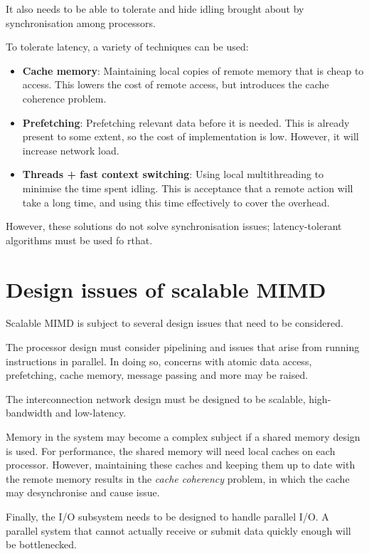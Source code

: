 It also needs to be able to tolerate and hide idling brought about by synchronisation among processors.

To tolerate latency, a variety of techniques can be used: \begin{itemize}
\item \textbf{Cache memory}: Maintaining local copies of remote memory that is cheap to access. This lowers the cost of remote access, but introduces the cache coherence problem.
\item \textbf{Prefetching}: Prefetching relevant data before it is needed. This is already present to some extent, so the cost of implementation is low. However, it will increase network load.
\item \textbf{Threads + fast context switching}: Using local multithreading to minimise the time spent idling. This is acceptance that a remote action will take a long time, and using this time effectively to cover the overhead.
\end{itemize}
However, these solutions do not solve synchronisation issues; latency-tolerant algorithms must be used fo rthat.

\section{Design issues of scalable MIMD}
Scalable MIMD is subject to several design issues that need to be considered.

The processor design must consider pipelining and issues that arise from running instructions in parallel. In doing so, concerns with atomic data access, prefetching, cache memory, message passing and more may be raised.

The interconnection network design must be designed to be scalable, high-bandwidth and low-latency.

Memory in the system may become a complex subject if a shared memory design is used. For performance, the shared memory will need local caches on each processor. However, maintaining these caches and keeping them up to date with the remote memory results in the \textit{cache coherency} problem, in which the cache may desynchronise and cause issue.

Finally, the I/O subsystem needs to be designed to handle parallel I/O. A parallel system that cannot actually receive or submit data quickly enough will be bottlenecked.
